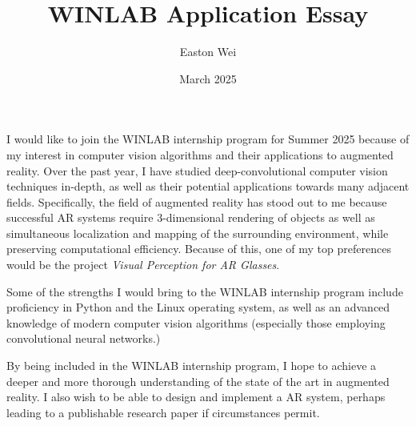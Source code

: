 \documentclass[11pt]{scrartcl}
\begin{document}
\title{WINLAB Application Essay}
\author{Easton Wei}
\date{March 2025}
\maketitle
I would like to join the WINLAB internship program for Summer 2025
because of my interest in computer vision algorithms and their
applications to augmented reality. Over the past year, I
have studied deep-convolutional computer vision techniques in-depth,
as well as their potential applications towards many adjacent fields.
Specifically, the field of augmented reality has stood out to me
because successful AR systems require 3-dimensional rendering of objects
as well as simultaneous localization and mapping of the surrounding environment,
while preserving computational efficiency.
Because of this, one of my top preferences would be the project
\textit{Visual Perception for AR Glasses}.

Some of the strengths I would bring to the WINLAB internship program
include proficiency in Python and the Linux operating system,
as well as an advanced knowledge of modern computer vision algorithms
(especially those employing convolutional neural networks.)

By being included in the WINLAB internship program,
I hope to achieve a deeper and more thorough understanding of the
state of the art in augmented reality. I also wish to be able
to design and implement a AR system, perhaps leading to a publishable
research paper if circumstances permit.
\end{document}
